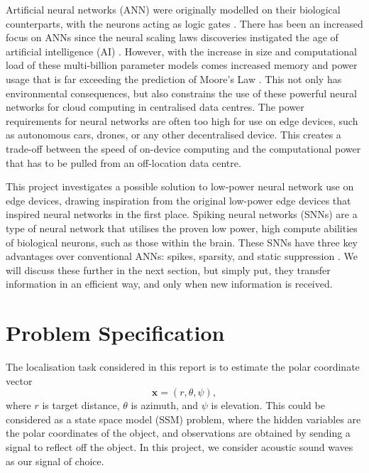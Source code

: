 Artificial neural networks (ANN) were originally modelled on their biological counterparts, with the neurons acting as logic gates \cite{Mcculloch1990AN}. There has been an increased focus on ANNs since the neural scaling laws discoveries instigated the age of artificial intelligence (AI) \cite{Kaplan2020ScalingModels}. However, with the increase in size and computational load of these multi-billion parameter models comes increased memory and power usage that is far exceeding the prediction of Moore's Law \cite{GholamiAIWall}. This not only has environmental consequences, but also constrains the use of these powerful neural networks for cloud computing in centralised data centres. The power requirements for neural networks are often too high for use on edge devices, such as autonomous cars, drones, or any other decentralised device. This creates a trade-off between the speed of on-device computing and the computational power that has to be pulled from an off-location data centre.

This project investigates a possible solution to low-power neural network use on edge devices, drawing inspiration from the original low-power edge devices that inspired neural networks in the first place. Spiking neural networks (SNNs) are a type of neural network that utilises the proven low power, high compute abilities of biological neurons, such as those within the brain. 
These SNNs have three key advantages over conventional ANNs: spikes, sparsity, and static suppression \cite{Eshraghian2023TRAININGLEARNING}. We will discuss these further in the next section, but simply put, they transfer information in an efficient way, and only when new information is received.


\section{Problem Specification}


The localisation task considered in this report is to estimate the polar coordinate vector
\begin{equation}
    \mathbf{x} = (r, \theta, \psi),
\end{equation}
where $r$ is target distance, $\theta$ is azimuth, and $\psi$ is elevation. This could be considered as a state space model (SSM) problem, where the hidden variables are the polar coordinates of the object, and observations are obtained by sending a signal to reflect off the object. In this project, we consider acoustic sound waves as our signal of choice.

